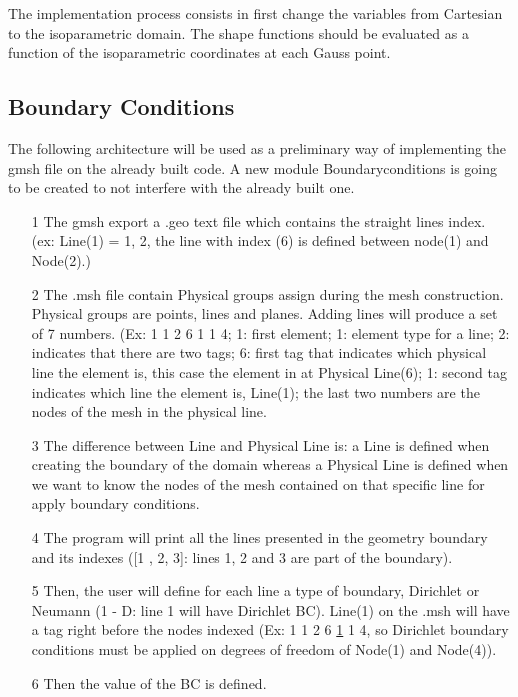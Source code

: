 \documentclass[10pt, a4paper]{article}
\begin{document}
The implementation process consists in first change the variables from Cartesian to the isoparametric domain. The shape functions should be evaluated as a function of the isoparametric coordinates at each Gauss point.

\subsection{Boundary Conditions}

The following architecture will be used as a preliminary way of implementing the gmsh file on the already built code. A new module \textsf{Boundaryconditions} is going to be created to not interfere with the already built one.

\begin{enumerate}
\item[1] The gmsh export a \textsf{.geo} text file which contains the straight lines index. (ex: Line(1) = {1, 2}, the line with index (6) is defined between node(1) and Node(2).)
\item[2] The \textsf{.msh} file contain Physical groups assign during the mesh construction. Physical groups are points, lines and planes. Adding lines will produce a set of 7 numbers. (Ex: 1 1 2 6 1 1 4; 1: first element; 1: element type for a line; 2: indicates that there are two tags; 6: first tag that indicates which physical line the element is, this case the element in at Physical Line(6); 1: second tag indicates which line the element is, Line(1); the last two numbers are the nodes of the mesh in the physical line.
\item[3] The difference between Line and Physical Line is: a Line is defined when creating the boundary of the domain whereas a Physical Line is defined when we want to know the nodes of the mesh contained on that specific line for apply boundary conditions.
\item[4] The program will print all the lines presented in the geometry boundary and its indexes ([1 , 2, 3]: lines 1, 2 and 3 are part of the boundary).
\item[5] Then, the user will define for each line a type of boundary, Dirichlet or Neumann (1 - D: line 1 will have Dirichlet BC). Line(1) on the \textsf{.msh} will have a tag right before the nodes indexed (Ex: 1 1 2 6 \underline{1} 1 4, so Dirichlet boundary conditions must be applied on degrees of freedom of Node(1) and Node(4)).
\item[6] Then the value of the BC is defined.
\end{enumerate}
\end{document}
